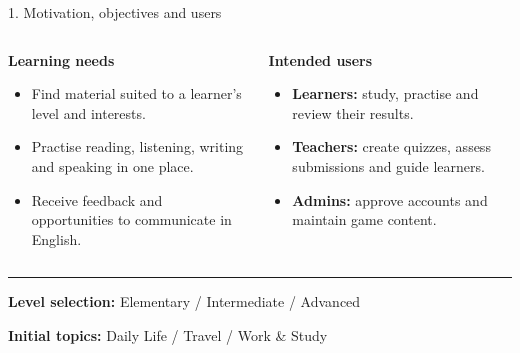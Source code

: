 \documentclass[10pt,t,aspectratio=169]{beamer}
\title{\ProjectName}
\subtitle{\texorpdfstring{%
  {\normalsize\ProjectSubtitle}\\[0.15em]
}{A Collaborative English-Learning Application | Topic Identification}}
\author{\texorpdfstring{%
  \MemberOne{} - \MemberOneID\\[0.12em]
  \MemberTwo{} - \MemberTwoID\\[0.12em]
  \MemberThree{} - \MemberThreeID
}{Đoàn Trọng Hoà, Trương Minh Hằng, Lê Vũ Bảo Châu}}
\institute{\vspace{0.3cm}\color{black}\small\normalfont\textbf{Lecturer:} \LecturerTitle{} \LecturerName}
\newenvironment{topicblock}[1]{%
  \par\vspace{0.12cm}%
  {\normalsize\bfseries\color{hustprimary}#1}\par\vspace{-0.08cm}%
}{\par}
\begin{document}
\husttitlepage
\resetPageCount
\showPageNumber

\useThinBar
\useStyleLogoOnly

\begin{frame}{1. Motivation, objectives and users}
  \begin{columns}[T,onlytextwidth]
    \begin{column}{0.48\textwidth}
      \begin{topicblock}{Learning needs}
        \small
        \begin{itemize}
          \setlength{\itemsep}{0.35em}
          \setlength{\parsep}{0pt}
          \item Find material suited to a learner's level and interests.
          \item Practise reading, listening, writing and speaking in one place.
          \item Receive feedback and opportunities to communicate in English.
        \end{itemize}
      \end{topicblock}
    \end{column}
    \begin{column}{0.48\textwidth}
      \begin{topicblock}{Intended users}
        \small
        \begin{itemize}
          \setlength{\itemsep}{0.35em}
          \setlength{\parsep}{0pt}
          \item \textbf{Learners:} study, practise and review their results.
          \item \textbf{Teachers:} create quizzes, assess submissions and guide learners.
          \item \textbf{Admins:} approve accounts and maintain game content.
        \end{itemize}
      \end{topicblock}
    \end{column}
  \end{columns}

  \vspace{0.18cm}
  {\color{hustprimary!30}\rule{\textwidth}{0.4pt}}\par
  \vspace{0.1cm}
  {\small\textbf{Level selection:} Elementary / Intermediate / Advanced}\par
  {\small\textbf{Initial topics:} Daily Life / Travel / Work \& Study}\par
\end{frame}
\end{document}
